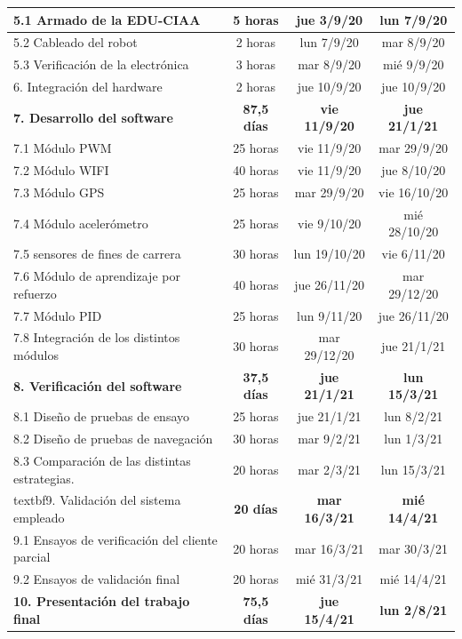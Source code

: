 \documentclass[11pt]{charter}
\begin{document}
\begin{table}[htbp]
{\begin{tabular}{|p{25em}|c|c|c|}
\hline 5.1 Armado de la EDU-CIAA & 5 horas & jue 3/9/20 & lun 7/9/20 \\
\hline 5.2 Cableado del robot & 2 horas & lun 7/9/20 & mar 8/9/20 \\
\hline 5.3 Verificación de la electrónica & 3 horas & mar 8/9/20 & mié 9/9/20 \\
\hline 6. Integración del hardware & 2 horas & jue 10/9/20 & jue 10/9/20 \\
\hline \textbf{7. Desarrollo del software} & \textbf{87,5 días} & \textbf{vie 11/9/20} & \textbf{jue 21/1/21} \\
\hline 7.1 Módulo PWM & 25 horas & vie 11/9/20 & mar 29/9/20 \\
\hline 7.2 Módulo WIFI & 40 horas & vie 11/9/20 & jue 8/10/20 \\
\hline 7.3 Módulo GPS & 25 horas & mar 29/9/20 & vie 16/10/20 \\
\hline 7.4 Módulo acelerómetro & 25 horas & vie 9/10/20 & mié 28/10/20 \\
\hline 7.5 sensores de fines de carrera & 30 horas & lun 19/10/20 & vie 6/11/20 \\
\hline 7.6 Módulo de aprendizaje por refuerzo & 40 horas & jue 26/11/20 & mar 29/12/20 \\
\hline 7.7 Módulo PID & 25 horas & lun 9/11/20 & jue 26/11/20 \\
\hline 7.8 Integración de los distintos módulos & 30 horas & mar 29/12/20 & jue 21/1/21 \\
\hline \textbf{8. Verificación del software} & \textbf{37,5 días} & \textbf{jue 21/1/21} & \textbf{lun 15/3/21} \\
\hline 8.1 Diseño de pruebas de ensayo & 25 horas & jue 21/1/21 & lun 8/2/21 \\
\hline 8.2 Diseño de pruebas de navegación & 30 horas & mar 9/2/21 & lun 1/3/21 \\
\hline 8.3 Comparación de las distintas estrategias. & 20 horas & mar 2/3/21 & lun 15/3/21 \\
\hline textbf{9. Validación del sistema empleado} & \textbf{20 días} & \textbf{mar 16/3/21} & \textbf{mié 14/4/21} \\
\hline 9.1 Ensayos de verificación del cliente parcial & 20 horas & mar 16/3/21 & mar 30/3/21 \\
\hline9.2 Ensayos de validación final & 20 horas & mié 31/3/21 & mié 14/4/21 \\
\hline \textbf{10. Presentación del trabajo final} & \textbf{75,5 días} & \textbf{jue 15/4/21} & \textbf{lun 2/8/21} \\

\end{tabular}}
\end{table}
\end{document}

